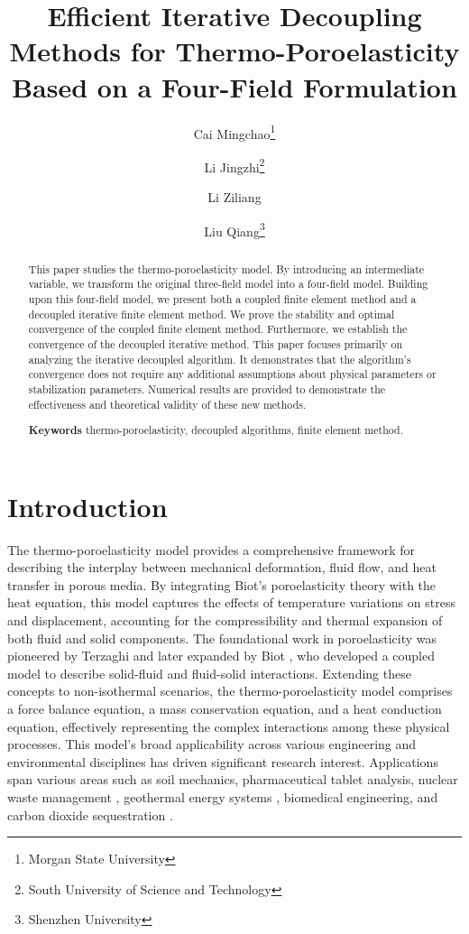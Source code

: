 \documentclass{article}
\title{Efficient Iterative Decoupling Methods for Thermo-Poroelasticity Based on a Four-Field Formulation}
\author{Cai Mingchao\thanks{Morgan State University}
       \and  Li Jingzhi\thanks{South University of Science and Technology }  \and Li Ziliang \footnotemark[2]
       \and
       Liu Qiang\thanks{Shenzhen University}\footnotemark[3]
        }
\date{}
\numberwithin{equation}{section}
\begin{document}
\maketitle

\begin{abstract}
This paper studies the thermo-poroelasticity model. By introducing an intermediate variable, we transform the original three-field model into a four-field model. Building upon this four-field model, we present both a coupled finite element method and a decoupled iterative finite element method. We prove the stability and optimal convergence of the coupled finite element method. Furthermore, we establish the convergence of the decoupled iterative method. 
This paper focuses primarily on analyzing the iterative decoupled algorithm. It demonstrates that the algorithm's convergence does not require any additional assumptions about physical parameters or stabilization parameters.
Numerical results are provided to demonstrate the effectiveness and theoretical validity of these new methods.


\noindent\textbf{Keywords} thermo-poroelasticity, decoupled algorithms, finite element method.
\\

\end{abstract}

\maketitle

\section{Introduction}
The thermo-poroelasticity model provides a comprehensive framework for describing the interplay between mechanical deformation, fluid flow, and heat transfer in porous media. By integrating Biot's poroelasticity theory with the heat equation, this model captures the effects of temperature variations on stress and displacement, accounting for the compressibility and thermal expansion of both fluid and solid components. The foundational work in poroelasticity was pioneered by Terzaghi and later expanded by Biot \cite{terzaghi1943theoretical, biot1941general, biot1955theory}, who developed a coupled model to describe solid-fluid and fluid-solid interactions. Extending these concepts to non-isothermal scenarios, the thermo-poroelasticity model comprises a force balance equation, a mass conservation equation, and a heat conduction equation, effectively representing the complex interactions among these physical processes. 
This model's broad applicability across various engineering and environmental disciplines has driven significant research interest. Applications span various areas such as soil mechanics, pharmaceutical tablet analysis, nuclear waste management \cite{yow2002coupled}, geothermal energy systems \cite{watanabe2011numerical}, biomedical engineering, and carbon dioxide sequestration \cite{rutqvist2002modeling}.
\end{document}
